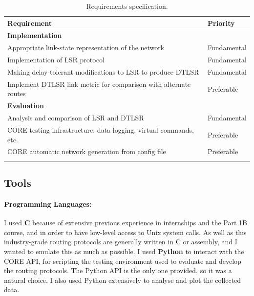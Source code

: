 \documentclass[withindex,glossary,openany]{cam-thesis}
\begin{document}
\begin{table}[H]
\centering
\begin{tabular}{@{}p{}l@{}}\toprule
\Large\textbf{Requirement} & \Large\textbf{Priority} \\
\midrule
\midrule
\textbf{Implementation} & \\
\midrule
Appropriate link-state representation of the network & Fundamental \\\addlinespace[0.2em]
Implementation of LSR protocol & Fundamental \\\addlinespace[0.2em]
Making delay-tolerant modifications to LSR to produce DTLSR & Fundamental \\\addlinespace[0.2em]
Implement DTLSR link metric for comparison with alternate routes & Preferable \\\addlinespace[0.2em]
\midrule
\midrule
\textbf{Evaluation} & \\
\midrule
Analysis and comparison of LSR and DTLSR & Fundamental \\\addlinespace[0.2em]
CORE testing infrastructure: data logging, virtual commands, etc. & Preferable \\\addlinespace[0.2em]
CORE automatic network generation from config file & Preferable \\\addlinespace[0.2em]
\bottomrule
\end{tabular}
\caption{Requirements specification.}
\label{table:requirements}
\end{table}

\subsection{Tools}

\paragraph{Programming Languages:}

I used \textbf{C} because of extensive previous experience in internships and the Part 1B course, and in order to have low-level access to Unix system calls. As well as this industry-grade routing protocols are generally written in C or assembly, and I wanted to emulate this as much as possible. I used \textbf{Python} to interact with the CORE API, for scripting the testing environment used to evaluate and develop the routing protocols. The Python API is the only one provided, so it was a natural choice. I also used Python extensively to analyse and plot the collected data.
\end{document}
